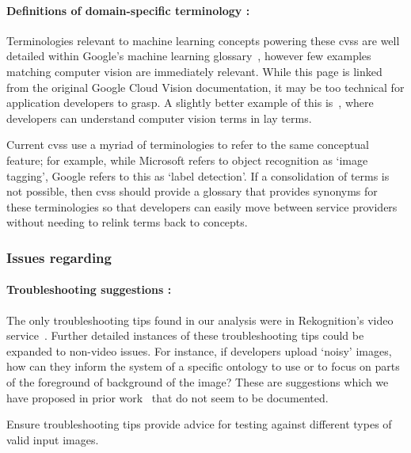 \paragraph{Definitions of domain-specific terminology :}  Terminologies relevant to machine learning concepts powering these \glspl{cvs} are well detailed within Google's machine learning glossary~, however few examples matching computer vision are immediately relevant. While this page is linked from the original Google Cloud Vision documentation, it may be too technical for application developers to grasp. A slightly better example of this is~, where developers can understand computer vision terms in lay terms.

\begin{leftbar}\SuggestedImprovement
Current \glspl{cvs} use a myriad of terminologies to refer to the same conceptual feature; for example, while Microsoft refers to object recognition as `image tagging', Google refers to this as `label detection'. If a consolidation of terms is not possible, then \glspl{cvs} should provide a glossary that provides synonyms for these terminologies so that developers can easily move between service providers without needing to relink terms back to concepts.
\end{leftbar}

\subsubsection[Dimension D Issues]{Issues regarding \dimd{}}

\paragraph{Troubleshooting suggestions :} The only troubleshooting tips found in our analysis were in Rekognition's video service~. Further detailed instances of these troubleshooting tips could be expanded to non-video issues. For instance, if developers upload `noisy' images, how can they inform the system of a specific ontology to use or to focus on parts of the foreground of background of the image? These are suggestions which we have proposed in prior work~\citep{Cummaudo:2019icsme} that do not seem to be documented.

\begin{leftbar}\SuggestedImprovement
Ensure troubleshooting tips provide advice for testing against different types of valid input images.   
\end{leftbar}

